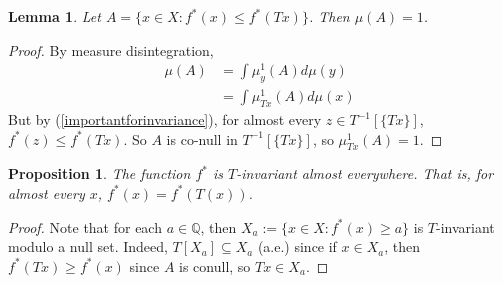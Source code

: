 \documentclass{article}
\newcommand{\Q}{\mathbb{Q}}
\let\oldref\ref
\renewcommand{\ref}[1]{(\oldref{#1})}
\newtheorem{proposition}[theorem]{Proposition}
\newtheorem{lemma}[theorem]{Lemma}
\theoremstyle{definition}
\begin{document}
\begin{lemma}
    Let $ A = \{x\in X: f^*(x)\leq f^*(Tx)\} $. Then $ \mu(A) = 1 $.
\end{lemma}
\begin{proof}
    By measure disintegration, 
    \begin{align*}
        \mu(A) &= \int \mu^1_y (A)d\mu(y)\\
        &= \int \mu^1_{Tx}(A) d\mu(x)
    \end{align*}
    But by \ref{importantforinvariance}, for almost every $ z\in T^{-1}[\{Tx\}] $, $ f^*(z)\leq f^*(Tx) $. So $ A $ is co-null in $ T^{-1}[\{Tx\}] $, so $ \mu^1_{Tx}(A) = 1 $.
\end{proof}
\begin{proposition}\label{invariance}
    The function $ f^*$ is $ T $-invariant almost everywhere. That is, for almost every $ x $, $ f^*(x) = f^*(T(x)) $.
\end{proposition}
\begin{proof}
    Note that for each $ a\in \Q $, then $ X_{a }:=\{x\in X:f^*(x)\geq a\} $ is $ T $-invariant modulo a null set. Indeed, $ T[X_{a}]\subseteq X_a $ (a.e.) since if $ x\in X_a $, then $ f^*(Tx)\geq f^*(x) $ since $ A $ is conull, so $ Tx\in X_a $.
\end{proof}
\end{document}
